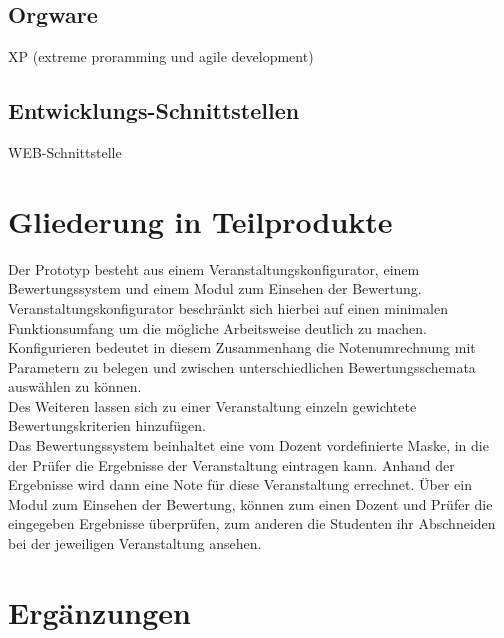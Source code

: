 		\subsection{Orgware}
		XP (extreme proramming und agile development)	
		\subsection{Entwicklungs-Schnittstellen}
		WEB-Schnittstelle
		
	\section{Gliederung in Teilprodukte}
	Der Prototyp besteht aus einem  Veranstaltungskonfigurator, einem Bewertungssystem und einem Modul zum Einsehen der Bewertung.\\
	Veranstaltungskonfigurator beschränkt sich hierbei auf einen minimalen Funktionsumfang um die mögliche Arbeitsweise deutlich zu machen.\\ 
	Konfigurieren bedeutet in diesem Zusammenhang die Notenumrechnung mit Parametern zu belegen und zwischen unterschiedlichen Bewertungsschemata auswählen zu können.\\ 
	Des Weiteren lassen sich zu einer Veranstaltung einzeln gewichtete Bewertungskriterien hinzufügen.\\ 
	Das Bewertungssystem beinhaltet eine vom Dozent vordefinierte Maske, in die der Prüfer die Ergebnisse der Veranstaltung eintragen kann. Anhand der Ergebnisse wird dann eine Note für diese Veranstaltung errechnet.
	Über ein Modul zum Einsehen der Bewertung, können zum einen Dozent und Prüfer die eingegeben Ergebnisse überprüfen, zum anderen die Studenten ihr Abschneiden bei der jeweiligen Veranstaltung ansehen.
		
	
	\section{Ergänzungen}
		
	
	
